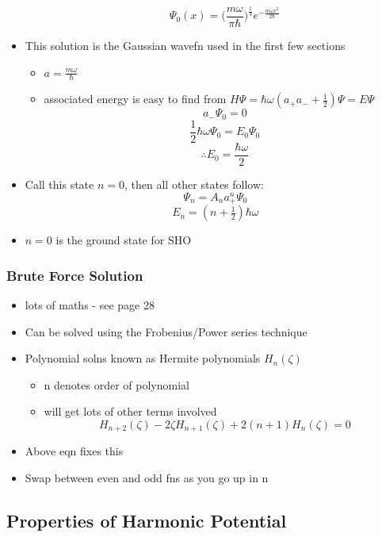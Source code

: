 \documentclass[a4paper,11pt,normalem]{article}
\begin{document}
\begin{itemize}
\begin{itemize}
\[    \] \[
    \Psi_{0}(x) = \Big(\frac{m\omega}{\pi\hbar} \Big)^{\tfrac{1}{4}} e^{-\tfrac{m\omega x^2}{2\hbar}}
    \]
  \end{itemize}
\item
  This solution is the Gaussian wavefn used in the first few sections
  \begin{itemize}
  \item
    \(a = \frac{m\omega}{\hbar}\)
  \item
    associated energy is easy to find from
    \(H\Psi = \hbar\omega(a_{+}a_{-} + \tfrac{1}{2})\Psi = E\Psi\) \[
    a_{-}\Psi_{0} = 0
    \] \[
    \frac{1}{2}\hbar\omega\Psi_0 = E_{0}\Psi_{0}
    \] \[
    \therefore E_0 = \frac{\hbar\omega}{2}
    \]
  \end{itemize}
\item
  Call this state \(n = 0\), then all other states follow: \[
  \Psi_n = A_{n}a_{+}^{n}\Psi_{0}
  \] \[
  E_n = (n + \tfrac{1}{2})\hbar\omega
  \]
\item
  \(n = 0\) is the ground state for SHO
\end{itemize}

\subsubsection{Brute Force Solution}
\begin{itemize}
\item
  lots of maths - see page 28
\item
  Can be solved using the Frobenius/Power series technique
\item
  Polynomial solns known as Hermite polynomials \(H_{n}(\zeta)\)
  \begin{itemize}
  \item
    n denotes order of polynomial
  \item
    will get lots of other terms involved \[
    H_{n + 2}(\zeta) - 2\zeta H_{n + 1}(\zeta) + 2(n + 1)H_{n}(\zeta) = 0
    \]
  \end{itemize}
\item
  Above eqn fixes this
\item
  Swap between even and odd fns as you go up in n
\end{itemize}

\subsection{Properties of Harmonic Potential}\label{properties-of-harmonic-potential}
\end{document}
